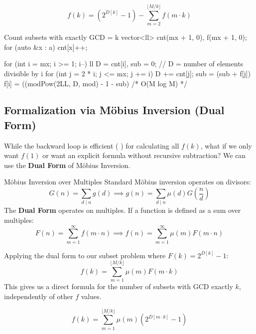 \documentclass[11pt]{article}
\newcommand{\complexity}[1]{%
  \tcbox[on line, 
    colback=complbg, 
    colframe=compltext!50, 
    boxrule=0.5pt, 
    arc=2pt, 
    boxsep=0pt, 
    left=3pt, right=3pt, top=2pt, bottom=2pt
  ]{\color{compltext}\small\ensuremath{#1}}%
}
\begin{document}
\begin{resultbox}
    \begin{equation}
        f(k) = (2^{D[k]} - 1) - \sum_{m=2}^{\lfloor M/k \rfloor} f(m \cdot k)
    \end{equation}
\end{resultbox}

\begin{vscode}{Count subsets with exactly GCD = k}
vector<ll> cnt(mx + 1, 0), f(mx + 1, 0);
for (auto &x : a)
    cnt[x]++;

for (int i = mx; i >= 1; i--)
{
    ll D = cnt[i], sub = 0; // D = number of elements divisible by i
    for (int j = 2 * i; j <= mx; j += i)
    {
        D += cnt[j];
        sub = (sub + f[j]) %
    }
    f[i] = ((modPow(2LL, D, mod) - 1 - sub) %
}
/* O(M log M) */
\end{vscode}

\subsection{Formalization via Möbius Inversion (Dual Form)}

While the backward loop is efficient (\complexity{O(M \log M)}) for calculating all $f(k)$, what if we only want $f(1)$ or want an explicit formula without recursive subtraction? We can use the \textbf{Dual Form} of Möbius Inversion.

\begin{conceptbox}{Möbius Inversion over Multiples}
    Standard Möbius inversion operates on divisors:
    \[ G(n) = \sum_{d \mid n} g(d) \implies g(n) = \sum_{d \mid n} \mu(d) G\left(\frac{n}{d}\right) \]
    The \textbf{Dual Form} operates on multiples. If a function is defined as a sum over multiples:
    \[ F(n) = \sum_{m=1}^{\infty} f(m \cdot n) \implies f(n) = \sum_{m=1}^{\infty} \mu(m) F(m \cdot n) \]
\end{conceptbox}

\begin{derivation}
    Applying the dual form to our subset problem where $F(k) = 2^{D[k]} - 1$:
    \[ f(k) = \sum_{m=1}^{\lfloor M/k \rfloor} \mu(m) F(m \cdot k) \]
    This gives us a direct formula for the number of subsets with GCD exactly $k$, independently of other $f$ values.
\end{derivation}

\begin{resultbox}
    \begin{equation}
        f(k) = \sum_{m=1}^{\lfloor M/k \rfloor} \mu(m) \left( 2^{D[m \cdot k]} - 1 \right)
        \label{eq:exact_gcd_mobius}
    \end{equation}
\end{resultbox}
\end{document}
